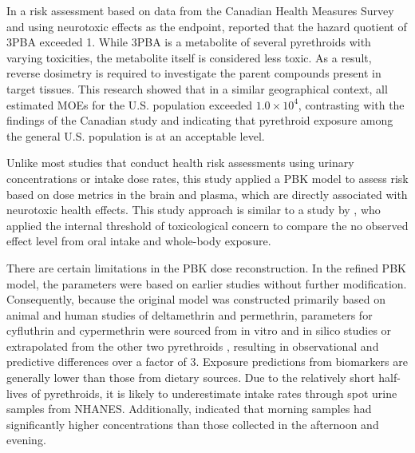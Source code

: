 \documentclass[toxics,article,submit,pdftex,moreauthors]{Definitions/mdpi}
\begin{document}
In a risk assessment based on data from the Canadian Health Measures
Survey and using neurotoxic effects as the endpoint,
\citet{faure_evaluation_2020} reported that the hazard quotient of 3PBA
exceeded 1. While 3PBA is a metabolite of several pyrethroids
with varying toxicities, the metabolite itself is considered less toxic.
As a result, reverse dosimetry is required to investigate the parent
compounds present in target tissues. This research showed that in a
similar geographical context, all estimated MOEs for the U.S. population
exceeded \(1.0 \times 10^{4}\), contrasting with the findings of the
Canadian study and indicating that pyrethroid exposure among the general
U.S. population is at an acceptable level.

Unlike most studies that conduct health risk assessments using urinary
concentrations or intake dose rates, this study applied a PBK model to assess
risk based on dose metrics in the brain and plasma, which are directly
associated with neurotoxic health effects. This study approach is similar to a
study by \citet{arnot_developing_2022}, who applied the internal threshold of
toxicological concern to compare the no observed effect level from oral intake
and whole-body exposure.

There are certain limitations in the PBK dose reconstruction. In the
refined PBK model, the parameters were based on earlier studies without
further modification. Consequently, because the original model was
constructed primarily based on animal and human studies of deltamethrin
and permethrin, parameters for cyfluthrin and cypermethrin were sourced
from in vitro and in silico studies or extrapolated from the other two
pyrethroids \citep{quindroit2019estimating}, resulting in observational
and predictive differences over a factor of 3. Exposure predictions from
biomarkers are generally lower than those from dietary sources. Due to
the relatively short half-lives of pyrethroids, it is likely to
underestimate intake rates through spot urine samples from NHANES.
Additionally, \citet{barr2010urinary} indicated that morning samples had
significantly higher concentrations than those collected in the
afternoon and evening. 
\end{document}
